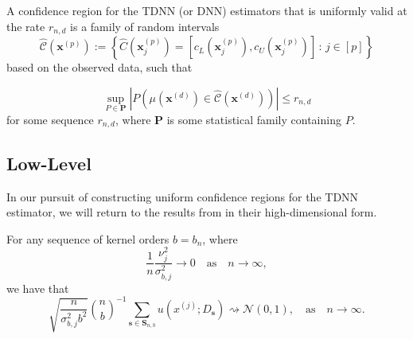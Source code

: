 \documentclass[letterpaper,10pt]{article}
\numberwithin{equation}{section}
\numberwithin{theorem}{section}
\numberwithin{remark}{section}
\numberwithin{example}{section}
\theoremstyle{definition}
\renewcommand{\hat}{\widehat}
\newcommand{\1}{\mathbb{1}}
\begin{document}
\vspace{0.5cm}
\begin{definition}
	A confidence region for the TDNN (or DNN) estimators that is uniformly valid at the rate $r_{n,d}$ is a family of random intervals
	\begin{equation}
		\hat{\mathcal{C}}\left(\mathbf{x}^{(p)}\right)
		:= \left\{\hat{C}(\mathbf{x}^{(p)}_{j}) = \left[c_{L}(\mathbf{x}^{(p)}_{j}), c_{U}(\mathbf{x}^{(p)}_{j})\right]\, : \, j \in [p]\right\}
	\end{equation}
	based on the observed data, such that

	\begin{equation}
		\sup_{P \in \mathbf{P}} \left| P\left(\mu(\mathbf{x}^{(d)}) \in \hat{\mathcal{C}}\left(\mathbf{x}^{(d)}\right)\right) \right| \leq r_{n,d}
	\end{equation}
	for some sequence $r_{n,d}$, where $\mathbf{P}$ is some statistical family containing $P$.
\end{definition}

\subsection{Low-Level}
In our pursuit of constructing uniform confidence regions for the TDNN estimator, we will return to the results from \citet{ritzwoller_uniform_2024} in their high-dimensional form.
\vspace{0.5cm}
\begin{theorem}
	For any sequence of kernel orders $b=b_n$, where
	\begin{equation}
		\frac{1}{n} \frac{\nu_j^2}{\sigma_{b, j}^2} \rightarrow 0
		\quad \text{as} \quad
		n \rightarrow \infty,
	\end{equation}
	we have that
	\begin{equation}
		\sqrt{\frac{n}{\sigma_{b, j}^2 b^2}} \binom{n}{b}^{-1} \sum_{\mathbf{s} \in \mathbf{S}_{n, b}} u\left(x^{(j)} ; D_{\mathbf{s}}\right) \rightsquigarrow \mathcal{N}(0,1),
		\quad \text{as} \quad
		n \rightarrow \infty.
	\end{equation}
\end{theorem}
\end{document}
